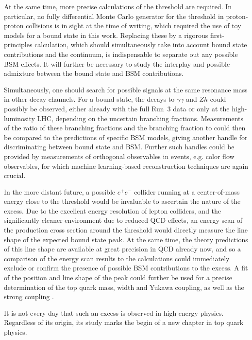 At the same time, more precise calculations of the \ttbar threshold are required. In particular, no fully differential Monte Carlo generator for the \ttbar threshold in proton-proton collisions is in sight at the time of writing, which required the use of toy models for a \ttbar bound state in this work. Replacing these by a rigorous first-principles calculation, which should simultaneously take into account bound state contributions and the \ttbar continuum, is indispensable to separate out any possible BSM effects. It will further be necessary to study the interplay and possible admixture between the bound state and BSM contributions.

Simultaneously, one should search for possible signals at the same resonance mass in other decay channels. For a \ttbar bound state, the decays to $\gamma\gamma$ and $Zh$ could possibly be observed, either already with the full Run~3 data or only at the high-luminosity LHC, depending on the uncertain branching fractions. Measurements of the ratio of these branching fractions and the branching fraction to \ttbar could then be compared to the predictions of specific BSM models, giving another handle for discriminating between \ttbar bound state and BSM. Further such handles could be provided by measurements of orthogonal observables in \ttbar events, e.g. color flow observables, for which machine learning-based reconstruction techniques are again crucial.

In the more distant future, a possible $e^+e^-$ collider running at a center-of-mass energy close to the \ttbar threshold would be invaluable to ascertain the nature of the excess. Due to the excellent energy resolution of lepton colliders, and the significantly cleaner environment due to reduced QCD effects, an energy scan of the \ttbar production cross section around the threshold would directly measure the line shape of the expected bound state peak. At the same time, the theory predictions of this line shape are available at great precision in QCD already now, and so a comparison of the energy scan results to the calculations could immediately exclude or confirm the presence of possible BSM contributions to the excess. A fit of the position and line shape of the peak could further be used for a precise determination of the top quark mass, width and Yukawa coupling, as well as the strong coupling \alphas.


\smallskip

It is not every day that such an excess is observed in high energy physics. Regardless of its origin, its study marks the begin of a new chapter in top quark physics.

